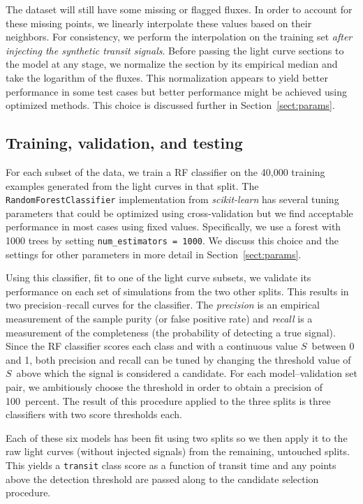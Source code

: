 \documentclass[12pt,preprint]{aastex}
\newcommand{\project}[1]{\textsl{#1}}
\newcommand{\sectionname}{Section}
\newcommand{\sectref}[1]{\ref{sect:#1}}
\newcommand{\Sect}[1]{\sectionname~\sectref{#1}}
\newcommand{\sect}[1]{\Sect{#1}}
\newcommand{\sectlabel}[1]{\label{sect:#1}}
\newcommand{\score}{{\ensuremath{S}}}
\begin{document}
The dataset will still have some missing or flagged fluxes.
In order to account for these missing points, we linearly interpolate these
values based on their neighbors.
For consistency, we perform the interpolation on the training set \emph{after
injecting the synthetic transit signals}.
Before passing the light curve sections to the model at any stage, we
normalize the section by its empirical median and take the logarithm of the
fluxes.
This normalization appears to yield better performance in some test cases but
better performance might be achieved using optimized methods.
This choice is discussed further in \sect{params}.


\subsection{Training, validation, and testing}\sectlabel{train}

For each subset of the data, we train a RF classifier on the 40,000 training
examples generated from the light curves in that split.
The \texttt{RandomForestClassifier} implementation from \project{scikit-learn}
has several tuning parameters that could be optimized using cross-validation
but we find acceptable performance in most cases using fixed values.
Specifically, we use a forest with 1000 trees by setting
\texttt{num\_estimators = 1000}.
We discuss this choice and the settings for other parameters in more detail in
\sect{params}.

Using this classifier, fit to one of the light curve subsets, we validate its
performance on each set of simulations from the two other splits.
This results in two precision--recall curves for the classifier.
The \emph{precision} is an empirical measurement of the sample purity (or
false positive rate) and \emph{recall} is a measurement of the completeness
(the probability of detecting a true signal).
Since the RF classifier scores each class and with a continuous value \score\
between 0 and 1, both precision and recall can be tuned by changing the
threshold value of \score\ above which the signal is considered a candidate.
For each model--validation set pair, we ambitiously choose the threshold in
order to obtain a precision of 100~percent.
The result of this procedure applied to the three splits is three classifiers
with two score thresholds each.

Each of these six models has been fit using two splits so we then apply it to
the raw light curves (without injected signals) from the remaining, untouched
splits.
This yields a \texttt{transit} class score as a function of transit time and
any points above the detection threshold are passed along to the candidate
selection procedure.
\end{document}
